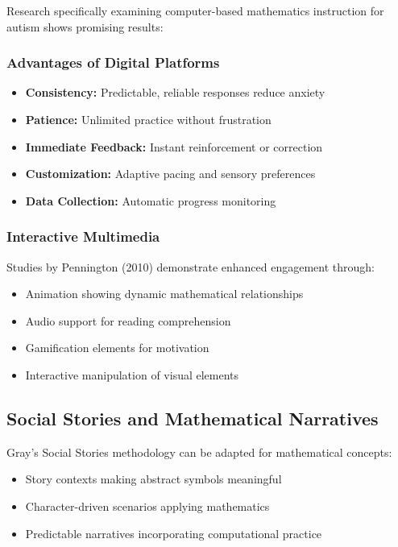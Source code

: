 \documentclass[12pt, a4paper]{article}
\begin{document}
Research specifically examining computer-based mathematics instruction for autism shows promising results:

\subsubsection{Advantages of Digital Platforms}

\begin{itemize}[leftmargin=*]
    \item \textbf{Consistency:} Predictable, reliable responses reduce anxiety
    \item \textbf{Patience:} Unlimited practice without frustration
    \item \textbf{Immediate Feedback:} Instant reinforcement or correction
    \item \textbf{Customization:} Adaptive pacing and sensory preferences
    \item \textbf{Data Collection:} Automatic progress monitoring
\end{itemize}

\subsubsection{Interactive Multimedia}

Studies by Pennington (2010) demonstrate enhanced engagement through:
\begin{itemize}[leftmargin=*]
    \item Animation showing dynamic mathematical relationships
    \item Audio support for reading comprehension
    \item Gamification elements for motivation
    \item Interactive manipulation of visual elements
\end{itemize}

\subsection{Social Stories and Mathematical Narratives}

Gray's Social Stories methodology can be adapted for mathematical concepts:

\begin{itemize}[leftmargin=*]
    \item Story contexts making abstract symbols meaningful
    \item Character-driven scenarios applying mathematics
    \item Predictable narratives incorporating computational practice
\end{itemize}
\end{document}
